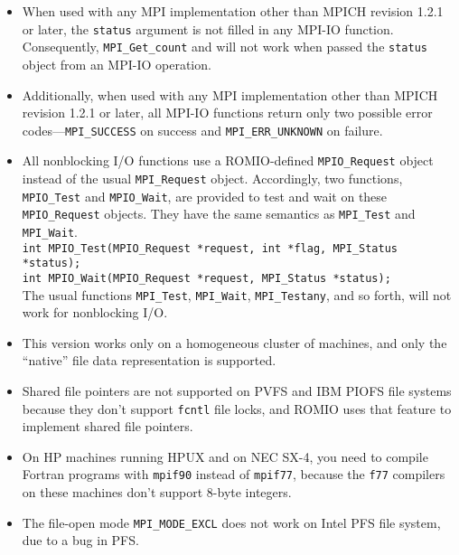 \begin{itemize}
\item When used with any MPI implementation other than MPICH revision
1.2.1 or later, the {\tt status} argument is not filled in any MPI-IO
function. Consequently, {\tt MPI\_Get\_count} and will not work when passed the {\tt status} object
from an MPI-IO operation.

\item Additionally, when used with any MPI implementation other than MPICH
revision 1.2.1 or later, all MPI-IO functions return only two possible
error codes---{\tt MPI\_SUCCESS} on success and {\tt MPI\_ERR\_UNKNOWN}
on failure.

\item All nonblocking I/O functions use a ROMIO-defined {\tt MPIO\_Request}
object instead of the usual {\tt MPI\_Request} object. Accordingly, two
functions, {\tt MPIO\_Test} and {\tt MPIO\_Wait}, are provided to test
and wait on these {\tt MPIO\_Request} objects. They have the same
semantics as {\tt MPI\_Test} and {\tt MPI\_Wait}.\\
\hspace*{.4in} {\tt int MPIO\_Test(MPIO\_Request *request, int *flag, MPI\_Status *status);}\\
\hspace*{.4in} {\tt int MPIO\_Wait(MPIO\_Request *request, MPI\_Status *status);}\\
The usual functions {\tt MPI\_Test}, {\tt MPI\_Wait}, {\tt MPI\_Testany},
and so forth, will not work for nonblocking I/O. 

\item This version works only on a homogeneous cluster of machines,
and only the ``native'' file data representation is supported.

\item Shared file pointers are not supported on PVFS and IBM PIOFS
file systems because they don't support {\tt fcntl} file locks,
and ROMIO uses that feature to implement shared file pointers.

\item On HP machines running HPUX and on NEC SX-4, you need to compile
Fortran programs with {\tt mpif90} instead of {\tt mpif77}, because
the {\tt f77} compilers on these machines don't support 8-byte integers.

\item The file-open mode {\tt MPI\_MODE\_EXCL} does not work on Intel
PFS file system, due to a bug in PFS.

\end{itemize}


